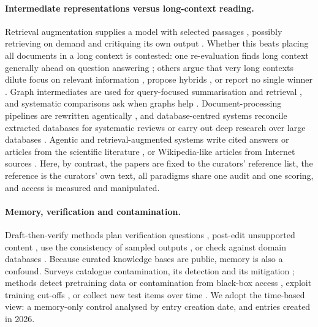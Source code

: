 \documentclass{article} %
\begin{document}
\paragraph{Intermediate representations versus long-context reading.}
Retrieval augmentation supplies a model with selected passages \citep{Lewis2020RetrievalaugmentedGeneration}, possibly retrieving on demand and critiquing its own output \citep{Asai2023SelfragLearning}. Whether this beats placing all documents in a long context is contested: one re-evaluation finds long context generally ahead on question answering \citep{Li2024LongContext}; others argue that very long contexts dilute focus on relevant information \citep{Yu2024DefenseRag}, propose hybrids \citep{li2024retrieval}, or report no single winner \citep{Li2025LaraBenchmarking}. Graph intermediates are used for query-focused summarisation \citep{edge2024local} and retrieval \citep{Gutirrez2024HipporagNeurobiologically}, and systematic comparisons ask when graphs help \citep{han2025rag,xiang2025use}. Document-processing pipelines are rewritten agentically \citep{shankar2025docetl}, and database-centred systems reconcile extracted databases for systematic reviews \citep{joshi2026sliders} or carry out deep research over large databases \citep{liu2026datastorm}. Agentic and retrieval-augmented systems write cited answers or articles from the scientific literature \citep{Lla2023PaperqaRetrievalaugmented,Asai2024OpenscholarSynthesizing,singh2025ai2,skarlinski2024language}, or Wikipedia-like articles from Internet sources \citep{shao2024assisting}. Here, by contrast, the papers are fixed to the curators' reference list, the reference is the curators' own text, all paradigms share one audit and one scoring, and access is measured and manipulated.

\paragraph{Memory, verification and contamination.}
Draft-then-verify methods plan verification questions \citep{dhuliawala2024chainofverification}, post-edit unsupported content \citep{Gao2022RarrResearching}, use the consistency of sampled outputs \citep{Manakul2023SelfcheckgptZeroresource}, or check against domain databases \citep{wang2025geneagent}. Because curated knowledge bases are public, memory is also a confound. Surveys catalogue contamination, its detection and its mitigation \citep{Xu2024BenchmarkData,Deng2024UnveilingSpectrum,Ravaut2024ComprehensiveSurvey,Cheng2025SurveyData,Chen2025RecentAdvances}; methods detect pretraining data or contamination from black-box access \citep{Shi2023DetectingPretraining,oren2024proving,golchin2024time,Golchin2025DataContamination}, exploit training cut-offs \citep{Roberts2023DataContamination}, or collect new test items over time \citep{Jain2024LivecodebenchHolistic,White2024LivebenchChallenging}. We adopt the time-based view: a memory-only control analysed by entry creation date, and entries created in 2026.
\end{document}
